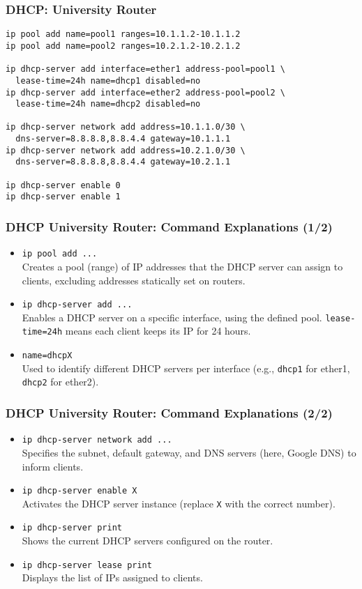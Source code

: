 \documentclass{beamer}
\begin{document}
\begin{frame}[fragile,label=dhcp-university]
\frametitle{DHCP: University Router}
\begin{lstlisting}
ip pool add name=pool1 ranges=10.1.1.2-10.1.1.2
ip pool add name=pool2 ranges=10.2.1.2-10.2.1.2

ip dhcp-server add interface=ether1 address-pool=pool1 \
  lease-time=24h name=dhcp1 disabled=no
ip dhcp-server add interface=ether2 address-pool=pool2 \
  lease-time=24h name=dhcp2 disabled=no

ip dhcp-server network add address=10.1.1.0/30 \
  dns-server=8.8.8.8,8.8.4.4 gateway=10.1.1.1
ip dhcp-server network add address=10.2.1.0/30 \
  dns-server=8.8.8.8,8.8.4.4 gateway=10.2.1.1

ip dhcp-server enable 0
ip dhcp-server enable 1
\end{lstlisting}
\end{frame}

\begin{frame}[fragile,label=dhcp-university-explanation1]
\frametitle{DHCP University Router: Command Explanations (1/2)}
\begin{itemize}
    \item \texttt{ip pool add ...} \\
    Creates a pool (range) of IP addresses that the DHCP server can assign to clients, excluding addresses statically set on routers.
    \item \texttt{ip dhcp-server add ...} \\
    Enables a DHCP server on a specific interface, using the defined pool. \texttt{lease-time=24h} means each client keeps its IP for 24 hours.
    \item \texttt{name=dhcpX} \\
    Used to identify different DHCP servers per interface (e.g., \texttt{dhcp1} for ether1, \texttt{dhcp2} for ether2).
\end{itemize}
\end{frame}

\begin{frame}[fragile,label=dhcp-university-explanation2]
\frametitle{DHCP University Router: Command Explanations (2/2)}
\begin{itemize}
    \item \texttt{ip dhcp-server network add ...} \\
    Specifies the subnet, default gateway, and DNS servers (here, Google DNS) to inform clients.
    \item \texttt{ip dhcp-server enable X} \\
    Activates the DHCP server instance (replace \texttt{X} with the correct number).
    \item \texttt{ip dhcp-server print} \\
    Shows the current DHCP servers configured on the router.
    \item \texttt{ip dhcp-server lease print} \\
    Displays the list of IPs assigned to clients.
\end{itemize}
\end{frame}
\end{document}
